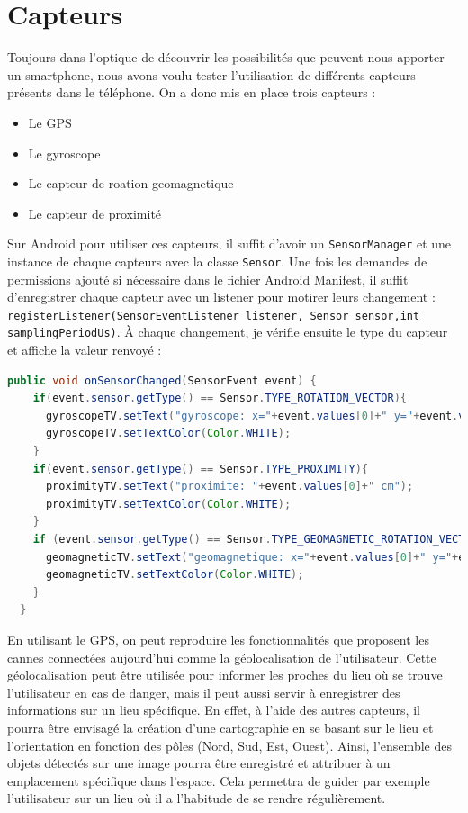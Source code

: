 \documentclass[UTF8]{EPURapport}
\begin{document}
\section{Capteurs}

Toujours dans l'optique de découvrir les possibilités que peuvent nous apporter un smartphone, nous avons voulu tester l'utilisation de différents capteurs présents dans le téléphone. On a donc mis en place trois capteurs : \\

\begin{itemize}
  \item Le GPS
  \item Le gyroscope
  \item Le capteur de roation geomagnetique
  \item Le capteur de proximité \\
\end{itemize}

Sur Android pour utiliser ces capteurs, il suffit d'avoir un \verb|SensorManager| et une instance de chaque capteurs avec la classe \verb|Sensor|. Une fois les demandes de permissions ajouté si nécessaire dans le fichier Android Manifest, il suffit d'enregistrer chaque capteur avec un listener pour motirer leurs changement : \verb|registerListener(SensorEventListener listener, Sensor sensor,int samplingPeriodUs)|. À chaque changement, je vérifie ensuite le type du capteur et affiche la valeur renvoyé : \\

\begin{lstlisting}[language=Java]
public void onSensorChanged(SensorEvent event) {
    if(event.sensor.getType() == Sensor.TYPE_ROTATION_VECTOR){
      gyroscopeTV.setText("gyroscope: x="+event.values[0]+" y="+event.values[1]+" z="+event.values[2]);
      gyroscopeTV.setTextColor(Color.WHITE);
    }
    if(event.sensor.getType() == Sensor.TYPE_PROXIMITY){
      proximityTV.setText("proximite: "+event.values[0]+" cm");
      proximityTV.setTextColor(Color.WHITE);
    }
    if (event.sensor.getType() == Sensor.TYPE_GEOMAGNETIC_ROTATION_VECTOR){
      geomagneticTV.setText("geomagnetique: x="+event.values[0]+" y="+event.values[1]+" z="+event.values[2]);
      geomagneticTV.setTextColor(Color.WHITE);
    }
  }
\end{lstlisting}

En utilisant le GPS, on peut reproduire les fonctionnalités que proposent les cannes connectées aujourd'hui comme la géolocalisation de l'utilisateur. Cette géolocalisation peut être utilisée pour informer les proches du lieu où se trouve l'utilisateur en cas de danger, mais il peut aussi servir à enregistrer des informations sur un lieu spécifique. En effet, à l'aide des autres capteurs, il pourra être envisagé la création d'une cartographie en se basant sur le lieu et l'orientation en fonction des pôles (Nord, Sud, Est, Ouest). Ainsi, l'ensemble des objets détectés sur une image pourra être enregistré et attribuer à un emplacement spécifique dans l'espace. Cela permettra de guider par exemple l'utilisateur sur un lieu où il a l'habitude de se rendre régulièrement.
\end{document}
